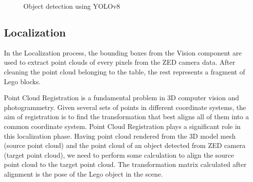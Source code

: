 \documentclass{article}
\begin{document}
	\begin{figure}[H]
		\centering
		\caption{Object detection using YOLOv8}
		\label{fig:detect}
	\end{figure}
	
	\subsection{Localization}
	In the Localization process, the bounding boxes from the Vision component are used to extract point clouds of every pixels from the ZED camera data. After cleaning the point cloud belonging to the table, the rest represents a fragment of Lego blocks.
	
	\begin{figure}[H]
		\centering
		\label{fig:pointcloud-clean}
	\end{figure}
	
	Point Cloud Registration is a fundamental problem in 3D computer vision and photogrammetry. Given several sets of points in different coordinate systems, the aim of registration is to find the transformation that best aligns all of them into a common coordinate system. Point Cloud Registration plays a significant role in this localization phase. Having point cloud rendered from the 3D model mesh (source point cloud) and the point cloud of an object detected from ZED camera (target point cloud), we need to perform some calculation to align the source point cloud to the target point cloud. The transformation matrix calculated after alignment is the pose of the Lego object in the scene.
	
\end{document}

